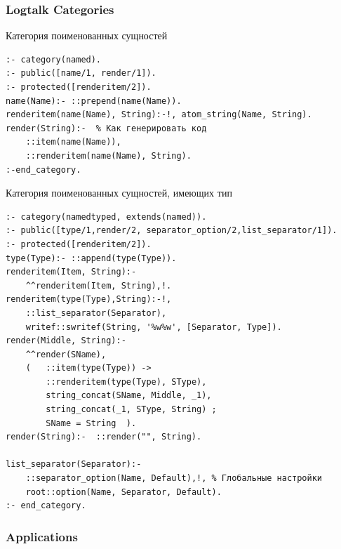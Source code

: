 \documentclass[10pt]{beamer}
\begin{document}
\begin{frame}[fragile]
  \frametitle{Logtalk Categories}
  Категория поименованных сущностей
\begin{verbatim}
:- category(named).
:- public([name/1, render/1]).
:- protected([renderitem/2]).
name(Name):- ::prepend(name(Name)).
renderitem(name(Name), String):-!, atom_string(Name, String).
render(String):-  % Как генерировать код
    ::item(name(Name)),
    ::renderitem(name(Name), String).
:-end_category.
\end{verbatim}
Категория поименованных сущностей, имеющих тип
\begin{verbatim}
:- category(namedtyped, extends(named)).
:- public([type/1,render/2, separator_option/2,list_separator/1]).
:- protected([renderitem/2]).
type(Type):- ::append(type(Type)).
renderitem(Item, String):-
    ^^renderitem(Item, String),!.
renderitem(type(Type),String):-!,
    ::list_separator(Separator),
    writef::swritef(String, '%w%w', [Separator, Type]).
render(Middle, String):-
    ^^render(SName),
    (   ::item(type(Type)) ->
        ::renderitem(type(Type), SType),
        string_concat(SName, Middle, _1),
        string_concat(_1, SType, String) ;
        SName = String  ).
render(String):-  ::render("", String).

list_separator(Separator):-
    ::separator_option(Name, Default),!, % Глобальные настройки
    root::option(Name, Separator, Default).
:- end_category.

\end{verbatim}
\end{frame}


\begin{frame}
  \frametitle{Applications}

\end{frame}
\end{document}
